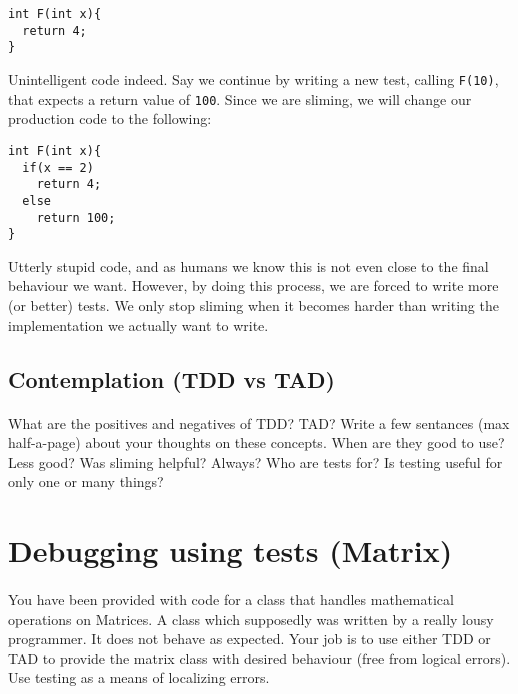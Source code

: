 \documentclass{article}
\begin{document}
      \begin{lstlisting}
int F(int x){
  return 4;
}
      \end{lstlisting}

      Unintelligent code indeed. Say we continue by writing a new test, calling \texttt{F(10)}, that expects a return value of \texttt{100}. Since we are sliming, we will change our production code to the following:

      \begin{lstlisting}
int F(int x){
  if(x == 2)
    return 4;
  else
    return 100;
}
      \end{lstlisting}

      Utterly stupid code, and as humans we know this is not even close to the final behaviour we want. However, by doing this process, we are forced to write more (or better) tests. We only stop sliming when it becomes harder than writing the implementation we actually want to write.

  \subsection{ Contemplation (TDD vs TAD) }
    \paragraph{}
      What are the positives and negatives of TDD? TAD? Write a few sentances (max half-a-page) about your thoughts on these concepts. When are they good to use? Less good? Was sliming helpful? Always? Who are tests for? Is testing useful for only one or many things?









  \pagebreak
  \section{ Debugging using tests (Matrix) }
    \paragraph{}
      You have been provided with code for a class that handles mathematical operations on Matrices. A class which supposedly was written by a really lousy programmer. It does not behave as expected. Your job is to use either TDD or TAD to provide the matrix class with desired behaviour (free from logical errors). Use testing as a means of localizing errors.
\end{document}
